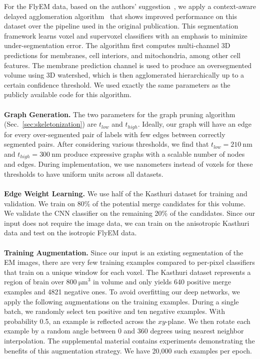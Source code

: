 For the FlyEM data, based on the authors' suggestion~\cite{takemura2017connectome}, we apply a context-aware delayed agglomeration algorithm~\cite{10.1371/journal.pone.0125825} that shows improved performance on this dataset over the pipeline used in the original publication. 
This segmentation framework learns voxel and supervoxel classifiers with an emphasis to minimize under-segmentation error. 
The algorithm first computes multi-channel 3D predictions for membranes, cell interiors, and mitochondria, among other cell features. 
The membrane prediction channel is used to produce an oversegmented volume using 3D watershed, which is then agglomerated hierarchically up to a certain confidence threshold. 
We used exactly the same parameters as the publicly available code for this algorithm.
\\~\\
\noindent\textbf{Graph Generation.}
The two parameters for the graph pruning algorithm (Sec.~\ref{sec:skeletonization}) are $t_{low}$ and $t_{high}$. 
Ideally, our graph will have an edge for every over-segmented pair of labels with few edges between correctly segmented pairs. 
After considering various thresholds, we find that $t_{low} = \SI{210}{\nano\meter}$ and $t_{high} = \SI{300}{\nano\meter}$ produce expressive graphs with a scalable number of nodes and edges.
During implementation, we use nanometers instead of voxels for these thresholds to have uniform units across all datasets.
\\~\\
\noindent\textbf{Edge Weight Learning.}
\label{sec:network-parameters}
We use half of the Kasthuri dataset for training and validation. 
We train on 80\% of the potential merge candidates for this volume.
We validate the CNN classifier on the remaining 20\% of the candidates. 
Since our input does not require the image data, we can train on the anisotropic Kasthuri data and test on the isotropic FlyEM data.
\\~\\
\noindent\textbf{Training Augmentation.}
Since our input is an existing segmentation of the EM images, there are very few training examples compared to per-pixel classifiers that train on a unique window for each voxel. 
The Kasthuri dataset represents a region of brain over $\SI[product-units=single]{800}{\micro\meter}^3$ in volume and only yields 640 positive merge examples and 4821 negative ones.
To avoid overfitting our deep networks, we apply the following augmentations on the training examples.
During a single batch, we randomly select ten positive and ten negative examples. 
With probability 0.5, an example is reflected across the $xy$-plane. 
We then rotate each example by a random angle between $0$ and $360$ degrees using nearest neighbor interpolation. 
The supplemental material contains experiments demonstrating the benefits of this augmentation strategy.
We have 20,000 such examples per epoch.

